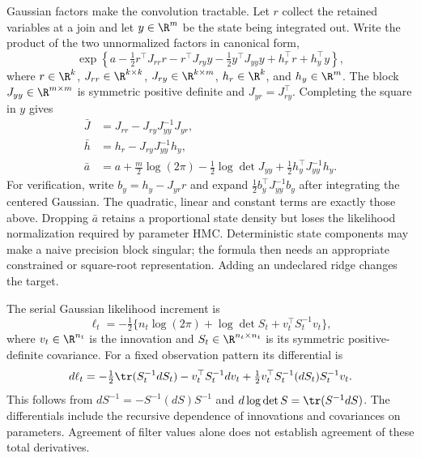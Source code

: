Gaussian factors make the convolution tractable. Let $r$ collect the retained
variables at a join and let $y\in\R^m$ be the state being integrated out.
Write the product of the two unnormalized factors in canonical form,
\begin{equation}
 \exp\!\left\{a-\tfrac12 r^\top J_{rr}r-r^\top J_{ry}y
       -\tfrac12y^\top J_{yy}y+h_r^\top r+h_y^\top y\right\},
 \label{eq:bf-modern-gaussian-join}
\end{equation}
where $r\in\R^k$, $J_{rr}\in\R^{k\times k}$,
$J_{ry}\in\R^{k\times m}$, $h_r\in\R^k$, and $h_y\in\R^m$.
The block $J_{yy}\in\R^{m\times m}$ is symmetric positive definite and
$J_{yr}=J_{ry}^\top$. Completing
the square in $y$ gives
\begin{align}
 \bar J&=J_{rr}-J_{ry}J_{yy}^{-1}J_{yr},\\
 \bar h&=h_r-J_{ry}J_{yy}^{-1}h_y,\\
 \bar a&=a+\tfrac m2\log(2\pi)-\tfrac12\log\det J_{yy}
                      +\tfrac12h_y^\top J_{yy}^{-1}h_y.
 \label{eq:bf-modern-gaussian-schur}
\end{align}
For verification, write $b_y=h_y-J_{yr}r$ and expand
$\tfrac12 b_y^\top J_{yy}^{-1}b_y$ after integrating the centered Gaussian.
The quadratic, linear and constant terms are exactly those above. Dropping
$\bar a$ retains a proportional state density but loses the likelihood
normalization required by parameter HMC. Deterministic state components may
make a naive precision block singular; the formula then needs an appropriate
constrained or square-root representation. Adding an undeclared ridge changes
the target.

The serial Gaussian likelihood increment is
\begin{equation}
 \ell_t=-\tfrac12\{n_t\log(2\pi)+\log\det S_t+v_t^\top S_t^{-1}v_t\},
 \label{eq:bf-modern-kalman-increment}
\end{equation}
where $v_t\in\R^{n_t}$ is the innovation and
$S_t\in\R^{n_t\times n_t}$ is its symmetric positive-definite covariance.
For a fixed observation pattern its differential is
\begin{equation}
 d\ell_t=-\tfrac12\tr(S_t^{-1}dS_t)
       -v_t^\top S_t^{-1}dv_t
       +\tfrac12v_t^\top S_t^{-1}(dS_t)S_t^{-1}v_t.
 \label{eq:bf-modern-kalman-score-differential}
\end{equation}
This follows from $dS^{-1}=-S^{-1}(dS)S^{-1}$ and
$d\log\det S=\tr(S^{-1}dS)$. The differentials include the recursive
dependence of innovations and covariances on parameters. Agreement of filter
values alone does not establish agreement of these total derivatives.

